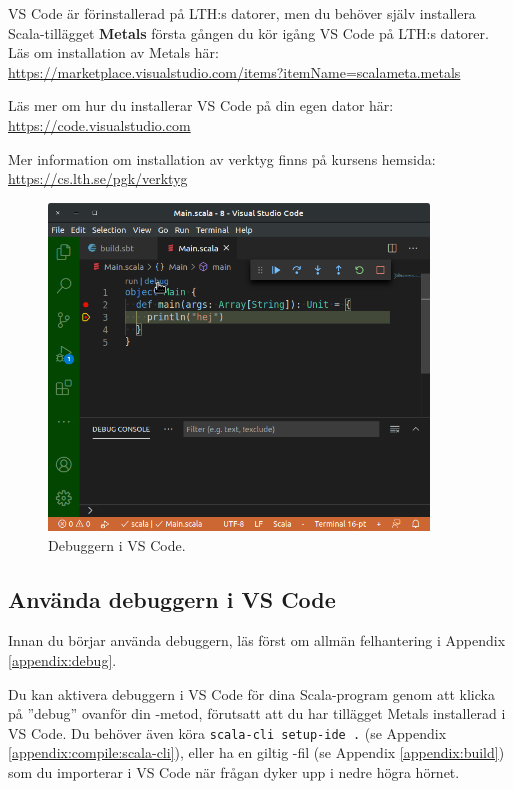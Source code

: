 VS Code är förinstallerad på LTH:s datorer, men du behöver själv installera Scala-tillägget \textbf{Metals} första gången du kör igång VS Code på LTH:s datorer. Läs om installation av Metals här: \\
\url{https://marketplace.visualstudio.com/items?itemName=scalameta.metals} 

Läs mer om hur du installerar VS Code på din egen dator här: \\\url{https://code.visualstudio.com}

Mer information om installation av verktyg finns på kursens hemsida: \\
\url{https://cs.lth.se/pgk/verktyg}

\begin{figure}
\centering
\includegraphics[width=0.9\textwidth]{../img/vscode-debug}
\caption{Debuggern i VS Code.\label{appendix-ide:vscode-debug}}
\end{figure}


\subsection{Använda debuggern i VS Code}

Innan du börjar använda debuggern, läs först om allmän felhantering i Appendix \ref{appendix:debug}.

Du kan aktivera debuggern i VS Code för dina Scala-program genom att klicka på ''debug'' ovanför din -metod, förutsatt att du har tillägget Metals installerad i VS Code. Du behöver även köra \texttt{scala-cli setup-ide .} (se Appendix \ref{appendix:compile:scala-cli}), eller ha en giltig -fil (se Appendix \ref{appendix:build}) som du importerar i VS Code när frågan dyker upp i nedre högra hörnet. 

